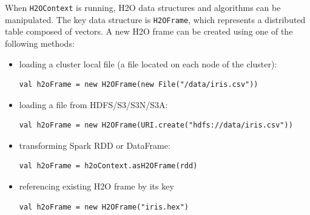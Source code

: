 \documentclass{standalone}
\begin{document}
When \texttt{H2OContext} is running, H2O data structures and algorithms can be manipulated. The key data structure is \texttt{H2OFrame}, which represents a distributed table composed of vectors. A new H2O frame can be created using one of the following methods:
\begin{itemize}
	\item loading a cluster local file (a file located on each node of the cluster):
\begin{lstlisting}[style=Scala]
val h2oFrame = new H2OFrame(new File("/data/iris.csv"))
\end{lstlisting}
	\item loading a file from HDFS/S3/S3N/S3A:
\begin{lstlisting}[style=Scala]
val h2oFrame = new H2OFrame(URI.create("hdfs://data/iris.csv"))
\end{lstlisting}
	\item transforming Spark RDD or DataFrame:
\begin{lstlisting}[style=Scala]
val h2oFrame = h2oContext.asH2OFrame(rdd)
\end{lstlisting}
	\item referencing existing H2O frame by its key
\begin{lstlisting}[style=Scala]
val h2oFrame = new H2OFrame("iris.hex")
\end{lstlisting}		
\end{itemize}
\end{document}

